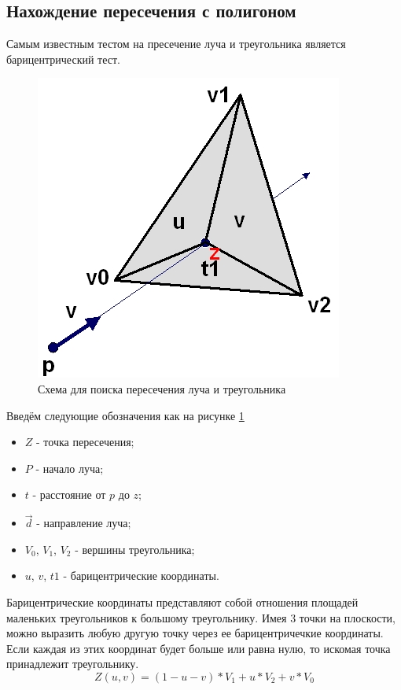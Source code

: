 \documentclass[12pt,a4paper,oneside]{report}
\begin{document}
			\subsection{Нахождение пересечения с полигоном}
				\quad Самым известным тестом на пресечение луча и треугольника является барицентрический тест.
				
				\begin{figure}[h]
					\centering
					\includegraphics{intersec}
					\caption{Схема для поиска пересечения луча и треугольника}
					\label{fig:intersec}
				\end{figure}
				
				\quad Введём следующие обозначения как на рисунке \ref{fig:intersec}
				\begin{itemize}
				    \item $Z$ - точка пересечения;
    				\item $P$ - начало луча;
    				\item $t$ - расстояние от $p$ до $z$;
    				\item $\vec{d}$ - направление луча;
    				\item $V_{0}$, $V_{1}$, $V_{2}$ - вершины треугольника;
    				\item $u$, $v$, $t1$ - барицентрические координаты.
    			\end{itemize}
    			
    			Барицентрические координаты представляют собой отношения площадей маленьких треугольников к большому треугольнику. Имея 3 точки на плоскости, можно выразить любую другую точку через ее барицентричечкие координаты. Если каждая из этих координат будет больше или равна нулю, то искомая точка принадлежит треугольнику. 
    			\begin{equation}
					Z(u, v) = (1 - u - v)*V_{1} + u*V_{2} + v*V_{0}
					\label{eq:1}
				\end{equation}
    			
\end{document}
